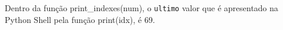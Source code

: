 \documentclass[12pt,varwidth=16cm,border=1pt]{standalone}
\begin{document}
Dentro da função print\_indexes(num), o \verb+ultimo+ valor que é apresentado na Python Shell pela função print(idx), é 69.

\questiomfalse
\end{document}
